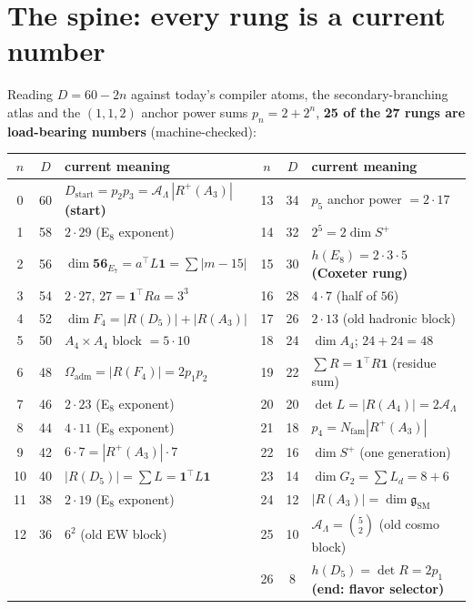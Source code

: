 \documentclass[11pt,a4paper]{article}
\newcommand{\Nfam}{N_{\mathrm{fam}}}
\newcommand{\Oadm}{\Omega_{\mathrm{adm}}}
\newcommand{\AL}{\mathcal A_\Lambda}
\theoremstyle{definition}
\renewcommand{\arraystretch}{1.15}
\begin{document}
\section{The spine: every rung is a current number}
Reading $D=60-2n$ against today's compiler atoms, the secondary-branching atlas and the $(1,1,2)$ anchor
power sums $p_n=2+2^n$, \textbf{25 of the 27 rungs are load-bearing numbers} (machine-checked):

\begin{center}\scriptsize
\renewcommand{\arraystretch}{1.04}
\begin{tabularx}{\linewidth}{@{}cc>{\raggedright\arraybackslash}p{4.9cm}cc>{\raggedright\arraybackslash}p{4.9cm}@{}}
\toprule
$n$ & $D$ & \textbf{current meaning} & $n$ & $D$ & \textbf{current meaning} \\
\midrule
0 & 60 & $D_{\mathrm{start}}=p_2p_3=\AL\,|R^+\!(A_3)|$ \textbf{(start)} & 13 & 34 & $p_5$ anchor power $=2\cdot17$ \\
1 & 58 & $2\cdot29$ (E$_8$ exponent) & 14 & 32 & $2^5=2\dim S^+$ \\
2 & 56 & $\dim\mathbf{56}_{E_7}=a^\top L\mathbf 1=\sum|m{-}15|$ & 15 & 30 & $h(E_8)=2{\cdot}3{\cdot}5$ \textbf{(Coxeter rung)} \\
3 & 54 & $2\cdot27$, $27=\mathbf 1^\top Ra=3^3$ & 16 & 28 & $4\cdot7$ (half of $56$) \\
4 & 52 & $\dim F_4=|R(D_5)|{+}|R(A_3)|$ & 17 & 26 & $2\cdot13$ (old hadronic block) \\
5 & 50 & $A_4{\times}A_4$ block $=5{\cdot}10$ & 18 & 24 & $\dim A_4$; $24{+}24{=}48$ \\
6 & 48 & $\Oadm=|R(F_4)|=2p_1p_2$ & 19 & 22 & $\sum R=\mathbf 1^\top R\mathbf 1$ (residue sum) \\
7 & 46 & $2\cdot23$ (E$_8$ exponent) & 20 & 20 & $\det L=|R(A_4)|=2\AL$ \\
8 & 44 & $4\cdot11$ (E$_8$ exponent) & 21 & 18 & $p_4=\Nfam|R^+\!(A_3)|$ \\
9 & 42 & $6\cdot7=|R^+\!(A_3)|\cdot7$ & 22 & 16 & $\dim S^+$ (one generation) \\
10 & 40 & $|R(D_5)|=\sum L=\mathbf 1^\top L\mathbf 1$ & 23 & 14 & $\dim G_2=\sum L_d=8{+}6$ \\
11 & 38 & $2\cdot19$ (E$_8$ exponent) & 24 & 12 & $|R(A_3)|=\dim\mathfrak g_{\mathrm{SM}}$ \\
12 & 36 & $6^2$ (old EW block) & 25 & 10 & $\AL=\binom52$ (old cosmo block) \\
   &    &                                & 26 & \phantom{0}8 & $h(D_5)=\det R=2p_1$ \textbf{(end: flavor selector)} \\
\bottomrule
\end{tabularx}
\end{center}
\end{document}
